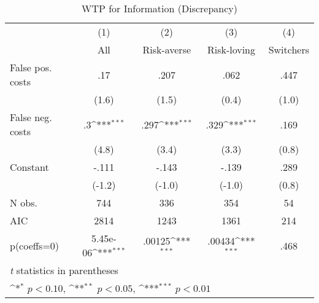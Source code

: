 \begin{table}[htbp]\centering
\def\sym#1{\ifmmode^{#1}\else\(^{#1}\)\fi}
\caption{WTP for Information (Discrepancy)}
\begin{tabular}{l*{4}{c}}
\hline\hline
                &\multicolumn{1}{c}{(1)}&\multicolumn{1}{c}{(2)}&\multicolumn{1}{c}{(3)}&\multicolumn{1}{c}{(4)}\\
                &\multicolumn{1}{c}{All}&\multicolumn{1}{c}{Risk-averse}&\multicolumn{1}{c}{Risk-loving}&\multicolumn{1}{c}{Switchers}\\
\hline
False pos. costs&      .17         &     .207         &     .062         &     .447         \\
                &    (1.6)         &    (1.5)         &    (0.4)         &    (1.0)         \\
False neg. costs&       .3\sym{***}&     .297\sym{***}&     .329\sym{***}&     .169         \\
                &    (4.8)         &    (3.4)         &    (3.3)         &    (0.8)         \\
Constant        &    -.111         &    -.143         &    -.139         &     .289         \\
                &   (-1.2)         &   (-1.0)         &   (-1.0)         &    (0.8)         \\
\hline
N obs.          &      744         &      336         &      354         &       54         \\
AIC             &     2814         &     1243         &     1361         &      214         \\
p(coeffs=0)     & 5.45e-06\sym{***}&   .00125\sym{***}&   .00434\sym{***}&     .468         \\
\hline\hline
\multicolumn{5}{l}{\footnotesize \textit{t} statistics in parentheses}\\
\multicolumn{5}{l}{\footnotesize \sym{*} \(p<0.10\), \sym{**} \(p<0.05\), \sym{***} \(p<0.01\)}\\
\end{tabular}
\end{table}
